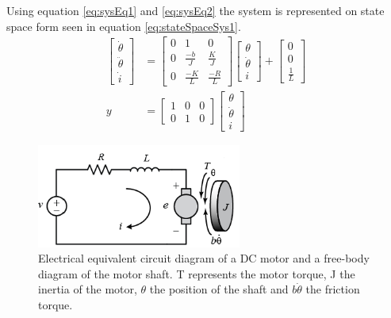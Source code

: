 \documentclass[../../main.tex]{subfiles}
\begin{document}
Using equation \ref{eq:sysEq1} and \ref{eq:sysEq2} the system is represented on state space form seen in equation \ref{eq:stateSpaceSys1}.
\begin{equation}\label{eq:stateSpaceSys1}
\begin{split}
\begin{bmatrix}
\dot{\theta}\\
\ddot{\theta}\\
\dot{i}
\end{bmatrix} &=
\begin{bmatrix}
0 & 1 & 0 \\
0 & \frac{-b}{J} & \frac{K}{J}\\
0 & \frac{-K}{L} & \frac{-R}{L}
\end{bmatrix}
\begin{bmatrix}
\theta\\
\dot{\theta}\\
i
\end{bmatrix}
+ 
\begin{bmatrix}
0 \\
0 \\
\frac{1}{L}
\end{bmatrix} \\
    y &= 
    \begin{bmatrix}
    1 & 0 & 0\\
    0 & 1 & 0
    \end{bmatrix}
    \begin{bmatrix}
    \theta\\
    \dot{\theta}\\
    i
    \end{bmatrix}
    \end{split}
\end{equation}

\begin{figure}[H]
    \centering
    \includegraphics[width=0.6\textwidth]{Sections/System_Modelling/Images/Armature_Layout.PNG}
    \caption{Electrical equivalent circuit diagram of a DC motor and a free-body diagram of the motor shaft. T represents the motor torque, J the inertia of the motor, $\theta$ the position of the shaft and $b\dot{\theta}$ the friction torque. \cite{universityofmichigan2019}}
    \label{fig:Armature_Circuit}
\end{figure}
\end{document}
